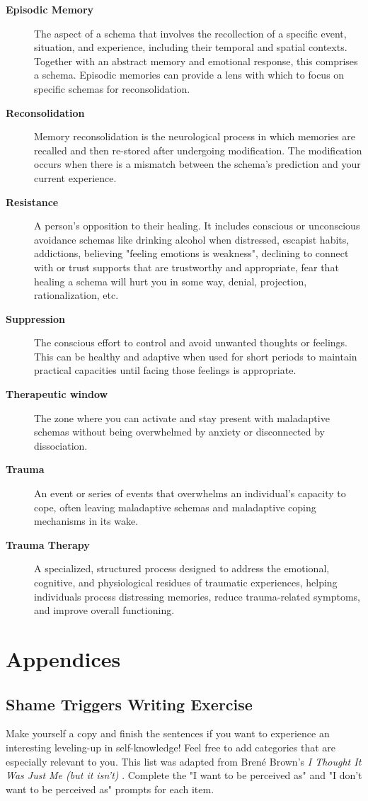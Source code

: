 \documentclass[12pt,letterpaper]{book}
\begin{document}
\begin{description}
    \item[\textbf{Episodic Memory}] The aspect of a schema that involves the recollection of a specific event, situation, and experience, including their temporal and spatial contexts. Together with an abstract memory and emotional response, this comprises a schema. Episodic memories can provide a lens with which to focus on specific schemas for reconsolidation.
    \item[\textbf{Reconsolidation}] Memory reconsolidation is the neurological process in which memories are recalled and then re-stored after undergoing modification. The modification occurs when there is a mismatch between the schema's prediction and your current experience.
    \item[\textbf{Resistance}] A person's opposition to their healing. It includes conscious or unconscious avoidance schemas like drinking alcohol when distressed, escapist habits, addictions, believing "feeling emotions is weakness", declining to connect with or trust supports that are trustworthy and appropriate, fear that healing a schema will hurt you in some way, denial, projection, rationalization, etc.
    \item[\textbf{Suppression}] The conscious effort to control and avoid unwanted thoughts or feelings. This can be healthy and adaptive when used for short periods to maintain practical capacities until facing those feelings is appropriate.
    \item[\textbf{Therapeutic window}] The zone where you can activate and stay present with maladaptive schemas without being overwhelmed by anxiety or disconnected by dissociation.
    \item[\textbf{Trauma}] An event or series of events that overwhelms an individual's capacity to cope, often leaving maladaptive schemas and maladaptive coping mechanisms in its wake.
    \item[\textbf{Trauma Therapy}] A specialized, structured process designed to address the emotional, cognitive, and physiological residues of traumatic experiences, helping individuals process distressing memories, reduce trauma-related symptoms, and improve overall functioning.
\end{description}
\appendix
\section{Appendices}
\subsection{Shame Triggers Writing Exercise}
\label{sec:shametriggers}
Make yourself a copy and finish the sentences if you want to experience an interesting leveling-up in self-knowledge! Feel free to add categories that are especially relevant to you. This list was adapted from Brené Brown's \textit{I Thought It Was Just Me (but it isn't)} \cite{brownThought}. Complete the "I want to be perceived as" and "I don't want to be perceived as" prompts for each item.
\end{document}
